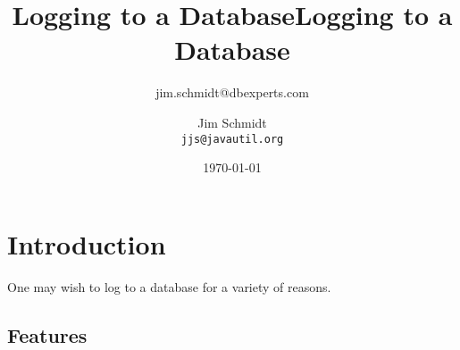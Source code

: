 \documentclass[a4paper,10pt]{book}
\title{Logging to a Database}
\author{jim.schmidt@dbexperts.com}
\begin{document}
\title{Logging to a Database}
\author{Jim Schmidt\\
  \texttt{jjs@javautil.org}}
\date{\today}
\maketitle
\tableofcontents
\chapter{Introduction}
One may wish to log to a database for a variety of reasons.
\section{Features}
\chapter{}
\end{document}
